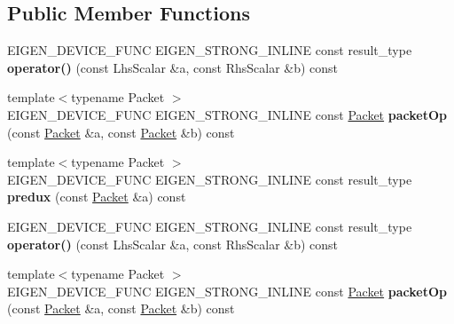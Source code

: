 \subsection*{Public Member Functions}
\begin{DoxyCompactItemize}
\item 
\mbox{\label{struct_eigen_1_1internal_1_1scalar__min__op_a5021113dd567c277778705c8e9cf86ee}} 
E\+I\+G\+E\+N\+\_\+\+D\+E\+V\+I\+C\+E\+\_\+\+F\+U\+NC E\+I\+G\+E\+N\+\_\+\+S\+T\+R\+O\+N\+G\+\_\+\+I\+N\+L\+I\+NE const result\+\_\+type {\bfseries operator()} (const Lhs\+Scalar \&a, const Rhs\+Scalar \&b) const
\item 
\mbox{\label{struct_eigen_1_1internal_1_1scalar__min__op_ae61166cacdf6033c2a352fccb0d09395}} 
{\footnotesize template$<$typename Packet $>$ }\\E\+I\+G\+E\+N\+\_\+\+D\+E\+V\+I\+C\+E\+\_\+\+F\+U\+NC E\+I\+G\+E\+N\+\_\+\+S\+T\+R\+O\+N\+G\+\_\+\+I\+N\+L\+I\+NE const \hyperlink{union_eigen_1_1internal_1_1_packet}{Packet} {\bfseries packet\+Op} (const \hyperlink{union_eigen_1_1internal_1_1_packet}{Packet} \&a, const \hyperlink{union_eigen_1_1internal_1_1_packet}{Packet} \&b) const
\item 
\mbox{\label{struct_eigen_1_1internal_1_1scalar__min__op_ad0ea70c2932e09c23e469946bd285cde}} 
{\footnotesize template$<$typename Packet $>$ }\\E\+I\+G\+E\+N\+\_\+\+D\+E\+V\+I\+C\+E\+\_\+\+F\+U\+NC E\+I\+G\+E\+N\+\_\+\+S\+T\+R\+O\+N\+G\+\_\+\+I\+N\+L\+I\+NE const result\+\_\+type {\bfseries predux} (const \hyperlink{union_eigen_1_1internal_1_1_packet}{Packet} \&a) const
\item 
\mbox{\label{struct_eigen_1_1internal_1_1scalar__min__op_a5021113dd567c277778705c8e9cf86ee}} 
E\+I\+G\+E\+N\+\_\+\+D\+E\+V\+I\+C\+E\+\_\+\+F\+U\+NC E\+I\+G\+E\+N\+\_\+\+S\+T\+R\+O\+N\+G\+\_\+\+I\+N\+L\+I\+NE const result\+\_\+type {\bfseries operator()} (const Lhs\+Scalar \&a, const Rhs\+Scalar \&b) const
\item 
\mbox{\label{struct_eigen_1_1internal_1_1scalar__min__op_ae61166cacdf6033c2a352fccb0d09395}} 
{\footnotesize template$<$typename Packet $>$ }\\E\+I\+G\+E\+N\+\_\+\+D\+E\+V\+I\+C\+E\+\_\+\+F\+U\+NC E\+I\+G\+E\+N\+\_\+\+S\+T\+R\+O\+N\+G\+\_\+\+I\+N\+L\+I\+NE const \hyperlink{union_eigen_1_1internal_1_1_packet}{Packet} {\bfseries packet\+Op} (const \hyperlink{union_eigen_1_1internal_1_1_packet}{Packet} \&a, const \hyperlink{union_eigen_1_1internal_1_1_packet}{Packet} \&b) const

\end{DoxyCompactItemize}
